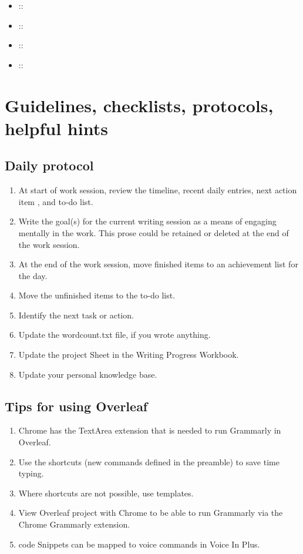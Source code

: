 \documentclass[11pt,letterpaper]{article}
\begin{document}
\begin{itemize}
\item ::
\item ::
\item ::
\item ::
\end{itemize}


\section{Guidelines, checklists, protocols, helpful hints}
\label{sec:orgaaf308a}


\subsection{Daily protocol}
\label{sec:org666a742}


\begin{enumerate}
\item At start of work session, review the timeline, recent daily entries, next action item , and
to-do list.
\item Write the goal(s) for the current writing session as a means of
engaging mentally in the work. This prose could be retained or
deleted at the end of the work session.
\item At the end of the work session, move finished items to an achievement
list for the day.
\item Move the unfinished items to the to-do list.
\item Identify the next task or action.
\item Update the wordcount.txt file, if you wrote anything.
\item Update the project Sheet in the Writing Progress Workbook.
\item Update your personal knowledge base.
\end{enumerate}

\subsection{Tips for using Overleaf}
\label{sec:org9eb8c85}

\begin{enumerate}
\item Chrome has the TextArea extension that is needed to run Grammarly in
Overleaf.
\item Use the shortcuts (new commands defined in the preamble) to save time
typing.
\item Where shortcuts are not possible, use templates.
\item View Overleaf project with Chrome to be able to run Grammarly via the
Chrome Grammarly extension.
\item code Snippets can be mapped to voice commands in Voice In Plus.
\end{enumerate}
\end{document}
